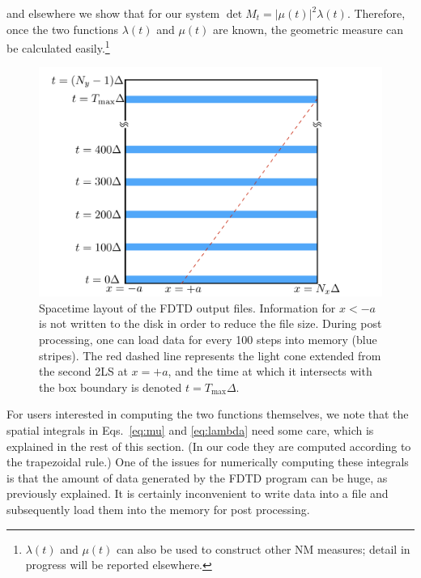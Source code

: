 \documentclass[final,1p,times]{elsarticle}
\begin{document}
and elsewhere \cite{FangNJP18} we show that for our system $\det M_t = |\mu(t)|^2 \lambda(t)$. 
Therefore, once the two functions $\lambda(t)$ and $\mu(t)$ are known, the geometric measure can be calculated easily.\footnote{$\lambda(t)$ and $\mu(t)$ can also be used to construct other NM measures; detail in progress will be reported elsewhere.}


\begin{figure}[!hbtp]
	\centering
	\includegraphics[scale=0.5]{file_process_schematic}
	\caption{Spacetime layout of the FDTD output files. Information for $x<-a$ is not written to the disk in order to reduce the file size. During post processing, one can load data for every 100 steps into memory (blue stripes). The red dashed line represents the light cone extended from the second 2LS at $x=+a$, and the time at which it intersects with the box boundary is denoted $t=T_\text{max}\Delta$.}
	\label{fig: file processing}
\end{figure}

For users interested in computing the two functions themselves, we note that the spatial integrals in Eqs.~\eqref{eq:mu} and \eqref{eq:lambda} need some care, which is explained in the rest of this section. 
(In our code they are computed according to the trapezoidal rule.)
One of the issues for numerically computing these integrals is that the amount of data generated by the FDTD program can be huge, as previously explained. %
It is certainly inconvenient to write data into a file and subsequently load them into the memory for post processing.
\end{document}
